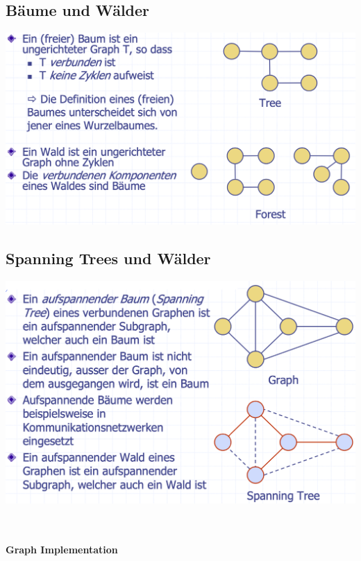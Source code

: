 \subsection{Bäume und Wälder}
\begin{center}
    \includegraphics[scale=.23]{graphic/11 Graph/Bäume und Wälder1.png}
\end{center}
\vspace{-8pt}


\subsection{Spanning Trees und Wälder}
\begin{center}
    \includegraphics[scale=.25]{graphic/11 Graph/Bäume und Wälder2.png}
\end{center}
\vspace{-8pt}

\vfill
$ $
\columnbreak

\paragraph{Graph Implementation}

